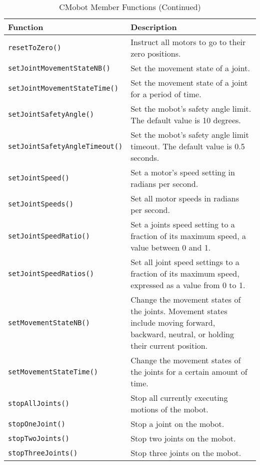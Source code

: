 \begin{table}[!h]
\begin{center}
\caption{CMobot Member Functions (Continued)}
\begin{tabular}{p{48 mm}p{110 mm}}
\hline
Function & Description \\
\hline
\texttt{resetToZero()} & Instruct all motors to go to their zero positions. \\
\texttt{setJointMovementStateNB()} & Set the movement state of a joint. \\
\texttt{setJointMovementStateTime()} & Set the movement state of a joint for a period of time.\\
\texttt{setJointSafetyAngle()} & Set the mobot's safety angle limit. The default value is 10 degrees.\\
\texttt{setJointSafetyAngleTimeout()} & Set the mobot's safety angle limit timeout. The default value is 0.5 seconds.\\
\texttt{setJointSpeed()} & Set a motor's speed setting in radians per second. \\
\texttt{setJointSpeeds()} & Set all motor speeds in radians per second. \\
\texttt{setJointSpeedRatio()} & Set a joints speed setting to a fraction of its maximum speed, a value between 0 and 1. \\
\texttt{setJointSpeedRatios()} & Set all joint speed settings to a fraction of its
maximum speed, expressed as a value from 0 to 1. \\
\texttt{setMovementStateNB()} & Change the movement states of the joints. Movement states include moving forward, backward, neutral, or holding their current position.\\
\texttt{setMovementStateTime()} & Change the movement states of the joints for a certain amount of time.\\
\texttt{stopAllJoints()} & Stop all currently executing motions of the mobot. \\
\texttt{stopOneJoint()} & Stop a joint on the mobot. \\
\texttt{stopTwoJoints()} & Stop two joints on the mobot. \\
\texttt{stopThreeJoints()} & Stop three joints on the mobot. \\
\hline
\end{tabular}
\end{center}
\label{mobilec_api_cbinary}
\end{table}

